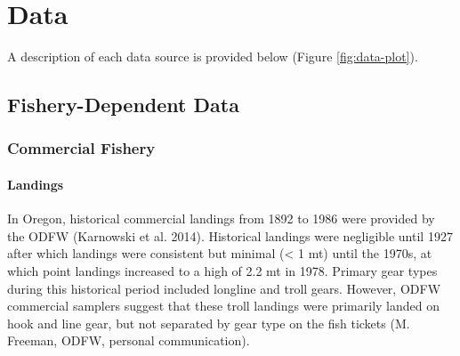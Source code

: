 \documentclass[11pt,
  english,
  a4paper,
]{article}
\begin{document}
\leavevmode\tagmcend\tagstructend\par


\hypertarget{data}{%
\section{Data}\label{data}}

\leavevmode\tagmcend\tagstructend


A description of each data source is provided below (Figure \ref{fig:data-plot}).

\leavevmode\tagmcend\tagstructend\par


\hypertarget{fishery-dependent-data}{%
\subsection{Fishery-Dependent Data}\label{fishery-dependent-data}}

\leavevmode\tagmcend\tagstructend


\hypertarget{commercial-fishery}{%
\subsubsection{Commercial Fishery}\label{commercial-fishery}}

\leavevmode\tagmcend\tagstructend


\hypertarget{landings}{%
\paragraph{Landings}\label{landings}}

\leavevmode\tagmcend\tagstructend


In Oregon, historical commercial landings from 1892 to 1986 were provided by the ODFW {(Karnowski et al. 2014)\leavevmode\tagmcend\tagstructend}. Historical landings were negligible until 1927 after which landings were consistent but minimal (\textless{} 1 mt) until the 1970s, at which point landings increased to a high of 2.2 mt in 1978. Primary gear types during this historical period included longline and troll gears. However, ODFW commercial samplers suggest that these troll landings were primarily landed on hook and line gear, but not separated by gear type on the fish tickets (M. Freeman, ODFW, personal communication).
\end{document}
